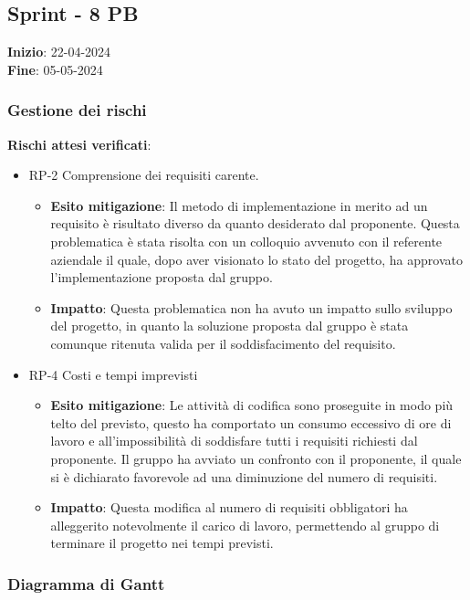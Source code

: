 \subsection{Sprint - 8 PB}
\textbf{Inizio}: 22-04-2024 \\
\textbf{Fine}: 05-05-2024

\subsubsection{Gestione dei rischi}
\textbf{Rischi attesi verificati}:

\begin{itemize}
	\item  RP-2 Comprensione dei requisiti carente.
		\begin{itemize}
			\item \textbf{Esito mitigazione}: Il metodo di implementazione in merito ad un requisito è risultato diverso da quanto desiderato dal proponente.
				Questa problematica è stata risolta con un colloquio avvenuto con il referente aziendale il quale, dopo aver visionato lo stato del progetto, ha approvato l'implementazione proposta dal gruppo.
			\item \textbf{Impatto}: Questa problematica non ha avuto un impatto sullo sviluppo del progetto, in quanto la soluzione proposta dal gruppo è stata comunque ritenuta valida per il soddisfacimento del requisito.
		\end{itemize}
	\item RP-4 Costi e tempi imprevisti
		\begin{itemize}
			\item \textbf{Esito mitigazione}: Le attività di codifica sono proseguite in modo più telto del previsto, questo ha comportato un consumo eccessivo di ore di lavoro e all'impossibilità di soddisfare tutti i requisiti richiesti dal proponente.
			Il gruppo ha avviato un confronto con il proponente, il quale si è dichiarato favorevole ad una diminuzione del numero di requisiti.
			\item \textbf{Impatto}: Questa modifica al numero di requisiti obbligatori ha alleggerito notevolmente il carico di lavoro, permettendo al gruppo di terminare il progetto nei tempi previsti.
		\end{itemize}
\end{itemize}

\subsubsection{Diagramma di Gantt}

